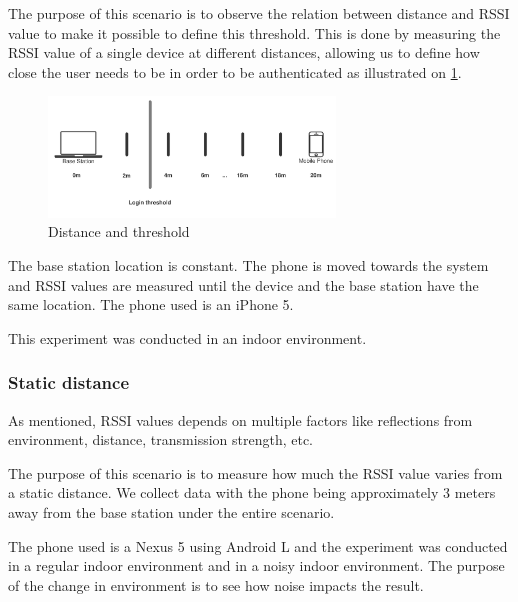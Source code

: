 The purpose of this scenario is to observe the relation between distance and RSSI value to make it possible to  define  this threshold. This is done by measuring the RSSI value of a single device at different distances, allowing us to define how close the user needs to be in order to be authenticated as illustrated on \cref{fig_distance}.

\begin{figure}
	\centering
	\includegraphics[width=3in]{img/distance}
	\caption{ Distance and threshold }
	\label{fig_distance}
\end{figure}

The base station location is constant. The phone is moved towards the system and RSSI values are measured until the device and the base station have the same location. The phone used is an iPhone 5.

This experiment was conducted in an indoor environment.


\subsubsection{Static distance}
\label{section:MovingTowardsSystem}
As mentioned, RSSI values depends on multiple factors like reflections from environment, distance, transmission strength, etc. 

The purpose of this scenario is to measure how much the RSSI value varies from a static distance. We collect data with the phone being approximately 3 meters away from the base station under the entire scenario.

The phone used is a Nexus 5 using Android L and the experiment was conducted in a regular indoor environment and in a noisy indoor environment. The purpose of the change in environment is to see how noise impacts the result.



